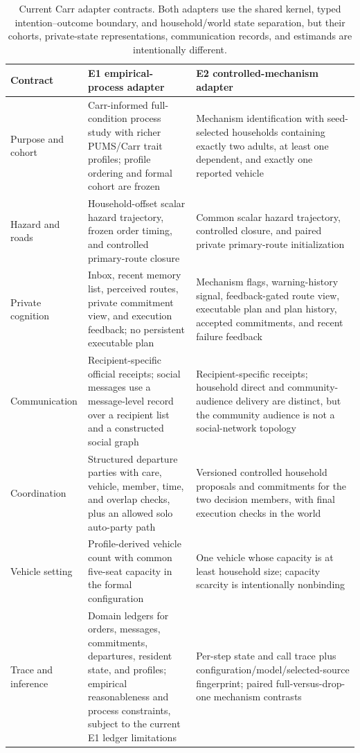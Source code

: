 \documentclass[journal]{IEEEtran}
\begin{document}
\begin{table}[t]
\centering
\footnotesize
\caption{Current Carr adapter contracts. Both adapters use the shared kernel,
typed intention--outcome boundary, and household/world state separation, but
their cohorts, private-state representations, communication records, and
estimands are intentionally different.}
\label{tab:adapter-contracts}
\begin{tabularx}{\textwidth}{@{}p{}Y Y@{}}
\toprule
Contract & E1 empirical-process adapter & E2 controlled-mechanism adapter \\
\midrule
Purpose and cohort & Carr-informed full-condition process study with richer
PUMS/Carr trait profiles; profile ordering and formal cohort are frozen &
Mechanism identification with seed-selected households containing exactly two
adults, at least one dependent, and exactly one reported vehicle \\
Hazard and roads & Household-offset scalar hazard trajectory, frozen order
timing, and controlled primary-route closure & Common scalar hazard trajectory,
controlled closure, and paired private primary-route initialization \\
Private cognition & Inbox, recent memory list, perceived routes, private
commitment view, and execution feedback; no persistent executable plan &
Mechanism flags, warning-history signal, feedback-gated route view, executable
plan and plan history, accepted commitments, and recent failure feedback \\
Communication & Recipient-specific official receipts; social messages use a
message-level record over a recipient list and a constructed social graph &
Recipient-specific receipts; household direct and community-audience delivery
are distinct, but the community audience is not a social-network topology \\
Coordination & Structured departure parties with care, vehicle, member, time,
and overlap checks, plus an allowed solo auto-party path & Versioned controlled
household proposals and commitments for the two decision members, with final
execution checks in the world \\
Vehicle setting & Profile-derived vehicle count with common five-seat capacity
in the formal configuration & One vehicle whose capacity is at least household
size; capacity scarcity is intentionally nonbinding \\
Trace and inference & Domain ledgers for orders, messages, commitments,
departures, resident state, and profiles; empirical reasonableness and process
constraints, subject to the current E1 ledger limitations & Per-step state and
call trace plus configuration/model/selected-source fingerprint; paired
full-versus-drop-one mechanism contrasts \\
\bottomrule
\end{tabularx}
\end{table}
\end{document}
